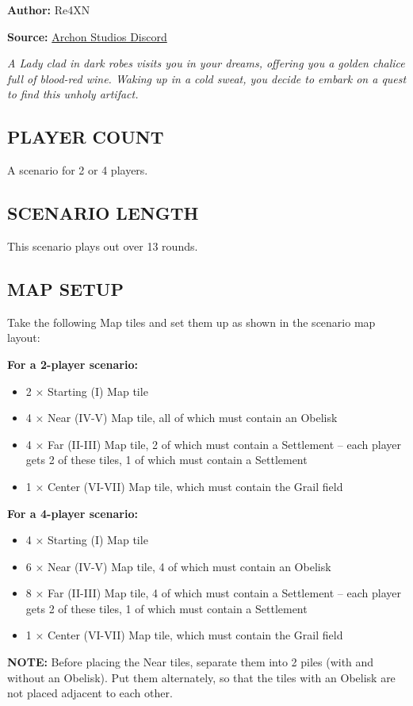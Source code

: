 
\begin{multicols*}{2}

\textbf{Author:} Re4XN

\textbf{Source:} \href{https://discord.com/channels/740870068178649108/1239631918643941509}{Archon Studios Discord}

\textit{A Lady clad in dark robes visits you in your dreams, offering you a golden chalice full of blood-red wine. Waking up in a cold sweat, you decide to embark on a quest to find this unholy artifact.}
\subsection*{\MakeUppercase{Player Count}}
A scenario for 2 or 4 players.
\subsection*{\MakeUppercase{Scenario Length}}
This scenario plays out over 13 rounds.
\subsection*{\MakeUppercase{Map Setup}}
Take the following Map tiles and set them up as shown in the scenario map layout:

\textbf{For a 2-player scenario:}
\begin{itemize}
    \item 2 × Starting (I) Map tile
    \item 4 × Near (IV-V) Map tile, all of which must contain an Obelisk
    \item 4 × Far (II-III) Map tile, 2 of which must contain a Settlement – each player gets 2 of these tiles, 1 of which must contain a Settlement
    \item 1 × Center (VI-VII) Map tile, which must contain the Grail field
\end{itemize}

\textbf{For a 4-player scenario:}
\begin{itemize}
    \item 4 × Starting (I) Map tile
    \item 6 × Near (IV-V) Map tile, 4 of which must contain an Obelisk
    \item 8 × Far (II-III) Map tile, 4 of which must contain a Settlement – each player gets 2 of these tiles, 1 of which must contain a Settlement
    \item 1 × Center (VI-VII) Map tile, which must contain the Grail field
\end{itemize}
\textbf{\MakeUppercase{Note:}} Before placing the Near tiles, separate them into 2 piles (with and without an Obelisk). Put them alternately, so that the tiles with an Obelisk are not placed adjacent to each other.

\end{multicols*}

